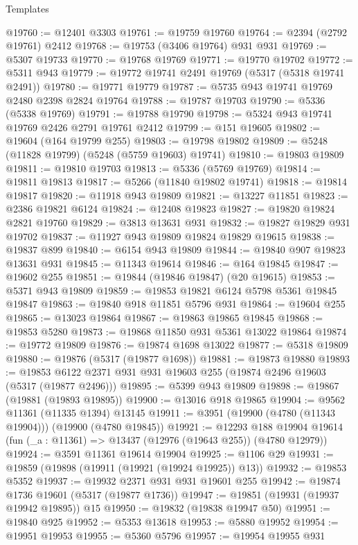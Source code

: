 \begin{lexlean}{Templates}
\begin{coremodule}
@19760 := @12401 @3303
@19761 := @19759 @19760
@19764 := @2394 (@2792 @19761) @2412
@19768 := @19753 (@3406 @19764) @931 @931
@19769 := @5307 @19733
@19770 := @19768 @19769
@19771 := @19770 @19702
@19772 := @5311 @943
@19779 := @19772 @19741 @2491 @19769 (@5317 (@5318 @19741 @2491))
@19780 := @19771 @19779
@19787 := @5735 @943 @19741 @19769 @2480 @2398 @2824 @19764
@19788 := @19787 @19703
@19790 := @5336 (@5338 @19769)
@19791 := @19788 @19790
@19798 := @5324 @943 @19741 @19769 @2426 @2791 @19761 @2412
@19799 := @151 @19605
@19802 := @19604 (@164 @19799 @255)
@19803 := @19798 @19802
@19809 := @5248 (@11828 @19799) (@5248 (@5759 @19603) @19741)
@19810 := @19803 @19809
@19811 := @19810 @19703
@19813 := @5336 (@5769 @19769)
@19814 := @19811 @19813
@19817 := @5266 (@11840 @19802 @19741)
@19818 := @19814 @19817
@19820 := @11918 @943 @19809
@19821 := @13227 @11851
@19823 := @2386 @19821 @6124
@19824 := @12408 @19823
@19827 := @19820 @19824 @2821 @19760
@19829 := @3813 @13631 @931
@19832 := @19827 @19829 @931 @19702
@19837 := @11927 @943 @19809 @19824 @19829 @19615
@19838 := @19837 @899
@19840 := @6154 @943 @19809
@19844 := @19840 @907 @19823 @13631 @931
@19845 := @11343 @19614
@19846 := @164 @19845
@19847 := @19602 @255
@19851 := @19844 (@19846 @19847) (@20 @19615)
@19853 := @5371 @943 @19809
@19859 := @19853 @19821 @6124 @5798 @5361 @19845 @19847
@19863 := @19840 @918 @11851 @5796 @931
@19864 := @19604 @255
@19865 := @13023 @19864
@19867 := @19863 @19865 @19845
@19868 := @19853 @5280
@19873 := @19868 @11850 @931 @5361 @13022 @19864
@19874 := @19772 @19809
@19876 := @19874 @1698 @13022
@19877 := @5318 @19809
@19880 := @19876 (@5317 (@19877 @1698))
@19881 := @19873 @19880
@19893 := @19853 @6122 @2371 @931 @931 @19603 @255 (@19874 @2496 @19603 (@5317 (@19877 @2496)))
@19895 := @5399 @943 @19809
@19898 := @19867 (@19881 (@19893 @19895))
@19900 := @13016 @918 @19865
@19904 := @9562 @11361 (@11335 @1394) @13145
@19911 := @3951 (@19900 (@4780 (@11343 @19904))) (@19900 (@4780 @19845))
@19921 := @12293
    @188
    @19904
    @19614
    (fun (_a : @11361) => @13437 (@12976 (@19643 @255)) (@4780 @12979))
@19924 := @3591 @11361 @19614 @19904
@19925 := @1106 @29
@19931 := @19859 (@19898 (@19911 (@19921 (@19924 @19925)) @13))
@19932 := @19853 @5352
@19937 := @19932 @2371 @931 @931 @19601 @255
@19942 := @19874 @1736 @19601 (@5317 (@19877 @1736))
@19947 := @19851 (@19931 (@19937 @19942 @19895)) @15
@19950 := @19832 (@19838 @19947 @50)
@19951 := @19840 @925
@19952 := @5353 @13618
@19953 := @5880 @19952
@19954 := @19951 @19953
@19955 := @5360 @5796
@19957 := @19954 @19955 @931

\end{coremodule}
\end{lexlean}
